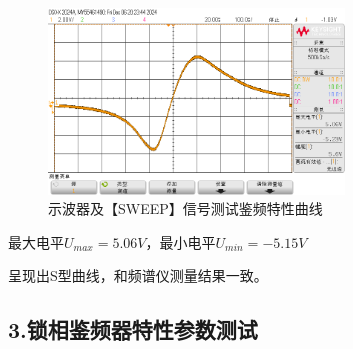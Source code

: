 \documentclass[UTF8]{ctexart}
\begin{document}
\begin{enumerate}[(1)]
\begin{figure}[H]
        \includegraphics[width=0.7\textwidth]{pics/22.png}
        \caption{示波器及【SWEEP】信号测试鉴频特性曲线}\label{fig:22}
    \end{figure}

    最大电平$U_{max}=5.06V$，最小电平$U_{min}=-5.15V$

    呈现出S型曲线，和频谱仪测量结果一致。
    
\end{enumerate}

\subsection*{3.锁相鉴频器特性参数测试}
\end{document}
